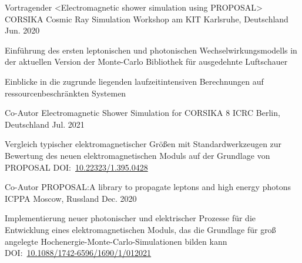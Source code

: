 \documentclass[11pt, a4paper]{Awesome-CV/awesome-cv}
\begin{document}
\begin{cventries}
    \cventry
    {Vortragender <Electromagnetic shower simulation using PROPOSAL>} %
    {CORSIKA Cosmic Ray Simulation Workshop am KIT} %
    {Karlsruhe, Deutschland} %
    {Jun. 2020} %
    {
        \begin{cvitems} %
        \item {Einführung des ersten leptonischen und photonischen
            Wechselwirkungsmodells in der aktuellen Version der
        Monte-Carlo Bibliothek für ausgedehnte Luftschauer}
        \item {Einblicke in die zugrunde liegenden laufzeitintensiven Berechnungen auf ressourcenbeschränkten Systemen}
        \end{cvitems}
    }

    \cventry
    {Co-Autor} %
    {Electromagnetic Shower Simulation for CORSIKA 8} %
    {ICRC Berlin, Deutschland} %
    {Jul. 2021} %
    {
        \begin{cvitems} %
        \item {Vergleich typischer elektromagnetischer Größen mit Standardwerkzeugen zur Bewertung des neuen elektromagnetischen Moduls auf der Grundlage von PROPOSAL DOI:~\href{https://doi.org/10.22323/1.395.0428}{10.22323/1.395.0428}
            }
        \end{cvitems}
    }

    \cventry
    {Co-Autor} %
    {PROPOSAL:\@ A library to propagate leptons and high energy photons} %
    {ICPPA Moscow, Russland} %
    {Dec. 2020} %
    {
        \begin{cvitems} %
        \item {Implementierung neuer photonischer und elektrischer Prozesse für die Entwicklung eines elektromagnetischen Moduls, das die Grundlage für groß angelegte Hochenergie-Monte-Carlo-Simulationen bilden kann DOI:~\href{https://doi.org/10.1088/1742-6596/1690/1/012021}{10.1088/1742-6596/1690/1/012021}}
        \end{cvitems}
    }
\end{cventries}
\end{document}

